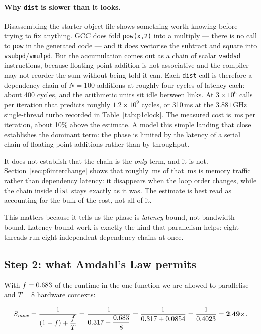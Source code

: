 \documentclass[11pt,a4paper]{article}
\newcommand{\ms}[1]{#1\,ms}
\begin{document}
\paragraph{Why \texttt{dist} is slower than it looks.} Disassembling the
starter object file shows something worth knowing before trying to fix
anything. GCC does fold \texttt{pow(x,2)} into a multiply --- there is no call
to \texttt{pow} in the generated code --- and it does vectorise the subtract
and square into \texttt{vsubpd}/\texttt{vmulpd}. But the accumulation comes out
as a chain of scalar \texttt{vaddsd} instructions, because floating-point
addition is not associative and the compiler may not reorder the sum without
being told it can. Each \texttt{dist} call is therefore a dependency chain of
$N = 100$ additions at roughly four cycles of latency each: about 400 cycles,
and the arithmetic units sit idle between links. At $3\times 10^{6}$ calls per
iteration that predicts roughly $1.2\times10^{9}$ cycles, or \ms{310} at the
$3.881$\,GHz single-thread turbo recorded in Table~\ref{tab:p1clock}. The
measured cost is \ms{\prognSixAssignOrigIter} per iteration, about 10\%
above the estimate. A model this simple landing that close establishes the
dominant term: the phase is limited by the latency of a serial chain of
floating-point additions rather than by throughput.

It does not establish that the chain is the \emph{only} term, and it is not.
Section~\ref{sec:p6interchange} shows that roughly
\ms{\prognSixInterchangeSaved} of that \ms{\prognSixAssignOrigIter} is
memory traffic rather than dependency latency: it disappears when the loop
order changes, while the chain inside \texttt{dist} stays exactly as it was.
The estimate is best read as accounting for the bulk of the cost, not all of
it.

This matters because it tells us the phase is \emph{latency}-bound, not
bandwidth-bound. Latency-bound work is exactly the kind that parallelism
helps: eight threads run eight independent dependency chains at once.

\subsection{Step 2: what Amdahl's Law permits}

With $f = 0.683$ of the runtime in the one function we are allowed to
parallelise and $T = 8$ hardware contexts:

\[
S_{max} = \frac{1}{(1 - f) + \dfrac{f}{T}}
        = \frac{1}{0.317 + \dfrac{0.683}{8}}
        = \frac{1}{0.317 + 0.0854}
        = \frac{1}{0.4023}
        = \mathbf{2.49\times} .
\]
\end{document}
